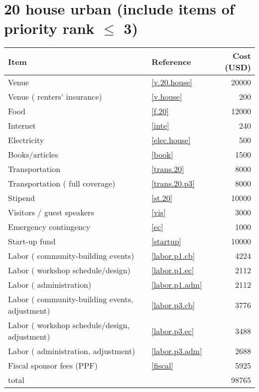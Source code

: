 \section*{20 house urban (include items of priority rank $\leq$ 3)}
\begin{center}
\begin{tabular}{llr}
Item & Reference & Cost (USD) \\ \hline
Venue & \ref{v.20.house} & 20000 \\
Venue ( renters' insurance) & \ref{v.house} & 200 \\
Food & \ref{f.20} & 12000 \\
Internet & \ref{inte} & 240 \\
Electricity & \ref{elec.house} & 500 \\
Books/articles & \ref{book} & 1500 \\
Transportation & \ref{trans.20} & 8000 \\
Transportation ( full coverage) & \ref{trans.20.p3} & 8000 \\
Stipend & \ref{st.20} & 10000 \\
Visitors / guest speakers & \ref{vis} & 3000 \\
Emergency contingency & \ref{ec} & 1000 \\
Start-up fund & \ref{startup} & 10000 \\
Labor ( community-building events) & \ref{labor.p1.cb} & 4224 \\
Labor ( workshop schedule/design) & \ref{labor.p1.ec} & 2112 \\
Labor ( administration) & \ref{labor.p1.adm} & 2112 \\
Labor ( community-building events, adjustment) & \ref{labor.p3.cb} & 3776 \\
Labor ( workshop schedule/design, adjustment) & \ref{labor.p3.ec} & 3488 \\
Labor ( administration, adjustment) & \ref{labor.p3.adm} & 2688 \\
Fiscal sponsor fees (PPF) & \ref{fiscal} & 5925 \\ \hline
total &  & 98765
\end{tabular}
\end{center}
\newpage
